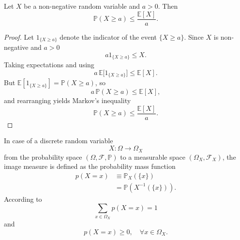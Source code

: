 \begin{theorem}
Let $X$ be a non-negative random variable and $a > 0$. Then
\begin{equation}
\mathbb{P}(X \geq a) \leq \frac{\mathbb{E}[X]}{a}.
\end{equation}
\end{theorem}
\begin{proof}
	Let $1_{\{X\ge a\}}$ denote the indicator of the event $\{X\ge a\}$. Since $X$ is non-negative and $a>0$
	\begin{equation}
		a1_{\{X\ge a\}} \le X.
	\end{equation}
	Taking expectations and using 
	\begin{equation}
		a\,\mathbb{E}\big[1_{\{X\ge a\}}\big] \le \mathbb{E}[X].
	\end{equation}
	But $\mathbb{E}[1_{\{X\ge a\}}]=\mathbb{P}(X\ge a)$, so
	\begin{equation}
		a\,\mathbb{P}(X\ge a) \le \mathbb{E}[X],
	\end{equation}
	and rearranging yields Markov's inequality
	\begin{equation}
		\mathbb{P}(X\ge a) \le \frac{\mathbb{E}[X]}{a}.
	\end{equation}
\end{proof}

\begin{definition}
	\label{def:pmf}
	In case of a discrete random variable
	\begin{equation}
		X: \Omega \to \Omega_X
	\end{equation} 
	from the probability space $(\Omega, \mathcal{F}, \mathbb{P})$ to a measurable space $(\Omega_X, \mathcal{F}_X)$, the image measure is defined as the probability mass function
	\begin{equation}
		\begin{split}
			p( X = x) &\equiv  \mathbb{P}_X(\{x\})\\
			& = \mathbb{P}(X^{-1}(\{x\})).
		\end{split}
		\label{eq:disc}
	\end{equation}
	According to 
	\begin{equation}
		\sum_{x\in \Omega_X} p(X=x) = 1
	\end{equation} 
	and
	\begin{equation}
		p(X=x) \geq 0, \quad \forall x\in \Omega_X.
	\end{equation}
\end{definition}

